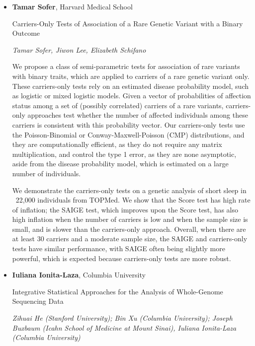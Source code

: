 \begin{itemize}
\item \textbf{Tamar Sofer}, Harvard Medical School

Carriers-Only Tests of Association of a Rare Genetic Variant with a Binary Outcome

\emph{\footnotesize Tamar Sofer, Jiwon Lee, Elizabeth Schifano}

We propose a class of semi-parametric tests for association of rare variants with binary traits, which are applied to carriers of a rare genetic variant only. These carriers-only tests rely on an estimated disease probability model, such as logistic or mixed logistic models. Given a vector of probabilities of affection status among a set of (possibly correlated) carriers of a rare variants, carriers-only approaches test whether the number of affected individuals among these carriers is consistent with this probability vector. Our carriers-only tests use the Poisson-Binomial or Conway-Maxwell-Poisson (CMP) distributions, and they are computationally efficient, as they do not require any matrix multiplication, and control the type 1 error, as they are none asymptotic, aside from the disease probability model, which is estimated on a large number of individuals. 

We demonstrate the carriers-only tests on a genetic analysis of short sleep in ~22,000 individuals from TOPMed. We show that the Score test has high rate of inflation; the SAIGE test, which improves upon the Score test, has also high inflation when the number of carriers is low and when the sample size is small, and is slower than the carriers-only approach. Overall, when there are at least 30 carriers and a moderate sample size, the SAIGE and carriers-only tests have similar performance, with SAIGE often being slightly more powerful, which is expected because carriers-only tests are more robust. 


\item \textbf{Iuliana Ionita-Laza}, Columbia University

Integrative Statistical Approaches for the Analysis of Whole-Genome Sequencing Data

\emph{\footnotesize Zihuai He (Stanford University); Bin Xu (Columbia University); Joseph Buxbaum (Icahn School of Medicine at Mount Sinai), Iuliana Ionita-Laza (Columbia University)}


\end{itemize}
